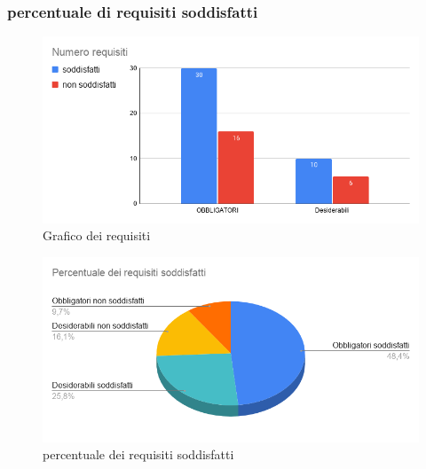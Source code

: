 \subsubsection{percentuale di requisiti soddisfatti}


    \begin{figure}[H]
        \centering
        \includegraphics[width=13 cm]{source/sections/images/num-requisiti.png}
        \caption{Grafico dei requisiti}
    \end{figure}

    \begin{figure}[H]
        \centering
        \includegraphics[width=14 cm]{source/sections/images/percentuale-requisiti.png}
        \caption{percentuale dei requisiti soddisfatti}
    \end{figure}

